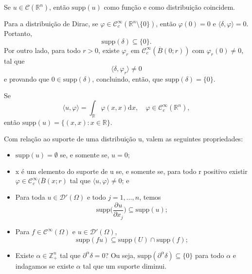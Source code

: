 \documentclass[../distribution_theory_notes.tex]{subfiles}
\begin{document}
\begin{example}
	Se \(u\in \mathcal{C}(\mathbb{R}^{n})\), então \(\mathrm{supp}(u)\) como função e como distribuição coincidem.
\end{example}
\begin{example}
	Para a distribuição de Dirac, se \(\varphi \in \mathcal{C}_{c}^{\infty}(\mathbb{R}^{n}\setminus{\{0 \}})\), então \(\varphi (0) = 0\) e \(\langle \delta , \varphi  \rangle=0\). Portanto,
	\[
		\mathrm{supp}(\delta )\subseteq \{0\}.
	\]
	Por outro lado, para todo \(r>0\), existe \(\varphi_{r}\) em \(\mathcal{C}_{c}^{\infty}(\overline{B}(0; r))\) com \(\varphi_{r}(0)\neq 0\), tal que
	\[
		\langle \delta , \varphi_{r} \rangle\neq 0
	\]
	e provando que \(0\in \mathrm{supp}(\delta )\), concluindo, então, que \(\mathrm{supp}(\delta )=\{0\}\).
\end{example}
\begin{example}
	Se
	\[
		\langle u, \varphi  \rangle = \int_{\mathbb{R}}^{}\varphi (x, x) \mathrm{d}x, \quad \varphi \in \mathcal{C}_{c}^{\infty}(\mathbb{R}^{n}),
	\]
	então \(\mathrm{supp}(u)=\{(x, x):x\in \mathbb{R}\}\).
\end{example}
\begin{prop*}
	Com relação ao suporte de uma distribuição u, valem as seguintes propriedades:
	\begin{itemize}
		\item[1)] \(\mathrm{supp}(u) = \emptyset \) se, e somente se, \(u = 0\);
		\item[2)] x é um elemento do suporte de u se, e somente se, para todo r positivo existir \(\varphi \in \mathcal{C}_{c}^{\infty}(\overline{B}(x; r)\) tal que \(\langle u, \varphi  \rangle\neq 0\); e
		\item[3)] Para toda \(u\in \mathcal{D}'(\Omega )\) e todo \(j=1, \dotsc , n\), temos
		      \[
			      \mathrm{supp}\biggl(\frac{\partial^{}u}{\partial x_{j}^{}}\biggr) \subseteq \mathrm{supp}(u);
		      \]
		\item[4)] Para \(f\in \mathcal{C}^{\infty}(\Omega )\) e \(u\in \mathcal{D}'(\Omega )\),
		      \[
			      \mathrm{supp}(fu)\subseteq \mathrm{supp}(U)\cap \mathrm{supp}(f);
		      \]
		\item[5)] Existe \(\alpha \in \mathbb{Z}_{+}^{n}\) tal que \(\partial^{\alpha }\delta =0\)? Ou seja, \(\mathrm{supp}(\partial^{\alpha }\delta )\subseteq \{0\}\) para todo \(\alpha \) e indagamos se existe \(\alpha \) tal que um suporte diminui.
	\end{itemize}
\end{prop*}
\end{document}
